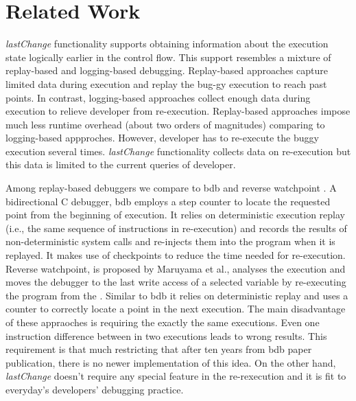 \documentclass[preprint]{sigplanconf}
\begin{document}
\section{Related Work}

\textit{lastChange} functionality supports obtaining information about the execution state logically earlier in the control flow. This support resembles a mixture of replay-based and logging-based debugging. Replay-based approaches capture limited data during execution and replay the bug-gy execution to reach past points. In contrast, logging-based approaches collect enough data during execution to relieve developer from re-execution. Replay-based approaches impose much less runtime overhead (about two orders of magnitudes) comparing to logging-based appproches. However, developer has to re-execute the buggy execution several times. \textit{lastChange} functionality collects data on re-execution but this data is limited to the current queries of developer.

Among replay-based debuggers we compare to bdb \cite{Boothe} and reverse watchpoint \cite{Maruyama}.  A bidirectional C debugger, bdb employs a step counter to locate the requested point from the beginning of execution. It relies on deterministic execution replay (i.e., the same sequence of instructions in re-execution) and records the results of non-deterministic system calls and re-injects them into the program when it is replayed. It makes use of checkpoints to reduce the time needed for re-execution.  Reverse watchpoint, is proposed by Maruyama et al., analyses the execution and moves the debugger to the last write access of a selected variable by re-executing the program from the \cite{Maruyama}.  Similar to bdb it relies on deterministic replay and uses a counter to correctly locate a point in the next execution. The main disadvantage of these appraoches is requiring the exactly the same executions. Even one instruction difference between in two executions leads to wrong results. This requirement is that much restricting that after ten years from bdb paper publication, there is no newer implementation of this idea. On the other hand, \textit{lastChange} doesn't require any special feature in the re-rexecution and it is fit to everyday's developers' debugging practice. 
\end{document}
